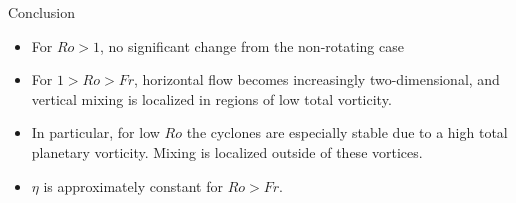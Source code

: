 \documentclass{beamer}
\begin{document}
\begin{frame}{Conclusion}

    \begin{itemize}
    \item For $Ro > 1$, no significant change from the non-rotating case
    \item For $1 > Ro > Fr$, horizontal flow becomes increasingly
    two-dimensional, and vertical mixing is localized in regions of low total
    vorticity. 
    \item In particular, for low $Ro$ the cyclones are especially stable due to
    a high total planetary vorticity. Mixing is localized outside of these
    vortices. 
    \item $\eta$ is approximately constant for $Ro > Fr$. 
    \end{itemize}

\end{frame}

{\scriptsize


}
\end{document}
